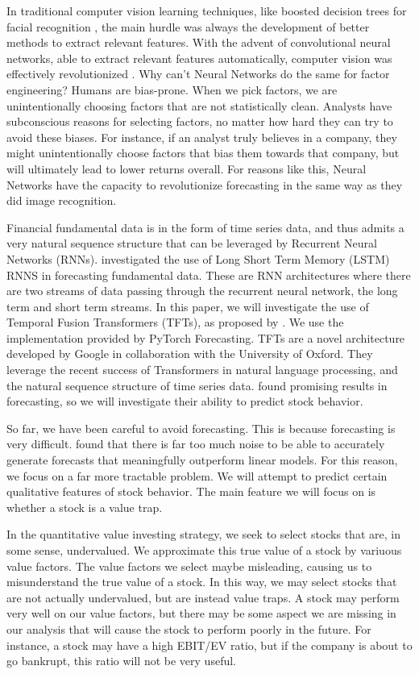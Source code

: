 \documentclass[AER]{AEA}
\begin{document}
In traditional computer vision learning techniques, like boosted decision trees for facial recognition 
\cite{ada-boost}, the main hurdle was always the development of better methods to extract relevant features. 
With the advent of convolutional neural networks, able to extract relevant features automatically, computer 
vision was effectively revolutionized \cite{alexnet}. Why can't Neural Networks do the same for factor 
engineering? Humans are bias-prone. When we pick factors, we are unintentionally choosing factors that are not 
statistically clean. Analysts have subconscious reasons for selecting factors, no matter how hard they can try 
to avoid these biases. For instance, if an analyst truly believes in a company, they might unintentionally 
choose factors that bias them towards that company, but will ultimately lead to lower returns overall. For 
reasons like this, Neural Networks have the capacity to revolutionize forecasting in the same way as they did 
image recognition. 

Financial fundamental data is in the form of time series data, and thus admits a very natural sequence 
structure that can be leveraged by Recurrent Neural Networks (RNNs). \cite{euclidean} investigated the use of 
Long Short Term Memory (LSTM) RNNS in forecasting fundamental data. These are RNN architectures where there are 
two streams of data passing through the recurrent neural network, the long term and short term streams. In this 
paper, we will investigate the use of Temporal Fusion Transformers (TFTs), as proposed by \cite{tft}. We use 
the implementation provided by PyTorch Forecasting. TFTs are a novel architecture developed by Google in collaboration with the University of Oxford. 
They leverage the recent success of Transformers in natural language processing, and the natural sequence
structure of time series data. \cite{tft} found promising results in forecasting, so we will investigate their
ability to predict stock behavior.

So far, we have been careful to avoid forecasting. This is because forecasting is very difficult. 
\cite{euclidean} found that there is far too much noise to be able to accurately generate forecasts that meaningfully 
outperform linear models. For this reason, we focus on a far more tractable problem. We will attempt to predict
certain qualitative features of stock behavior. The main feature we will focus on is whether a stock is a value trap.

In the quantitative value investing strategy, we seek to select stocks that are, in some sense, undervalued.
We approximate this true value of a stock by variuous value factors. 
The value factors we select maybe misleading, causing us to misunderstand the true value of a stock.
In this way, we may select stocks that are not actually undervalued, but are instead value traps.
A stock may perform very well on our value factors, but there may be some aspect we are missing in our analysis
that will cause the stock to perform poorly in the future. For instance, a stock may have a high EBIT/EV ratio,
but if the company is about to go bankrupt, this ratio will not be very useful. 
\end{document}
